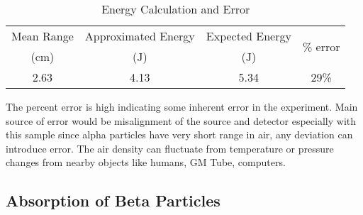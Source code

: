 \documentclass[11pt]{article}
\begin{document}
	\begin{table}[htbp]
		\centering
		\caption{Energy Calculation and Error}
		\begin{tabular}{cccc}
			\toprule
			Mean Range & Approximated Energy & Expected Energy & \multirow{2}[2]{*}{\% error} \\
			($\unit{\centi\meter}$) & ($\unit{\joule}$) & ($\unit{\joule}$) &  \\
			\midrule
			2.63 & 4.13 & 5.34 & 29\% \\
			\bottomrule
		\end{tabular}%
		\label{tab:9_Table_2}%
	\end{table}%
	
	The percent error is high indicating some inherent error in the experiment. Main source of error would be misalignment of the source and detector especially with this sample since alpha particles have very short range in air, any deviation can introduce error. The air density can fluctuate from temperature or pressure changes from nearby objects like humans, GM Tube, computers.
	
\clearpage

	\subsection{Absorption of Beta Particles}
	
\end{document}
